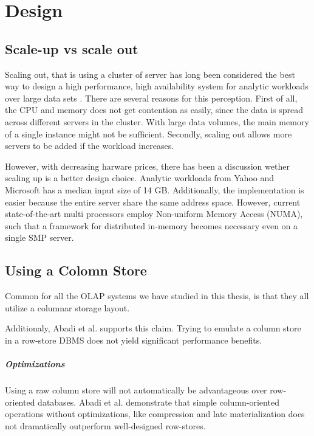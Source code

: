 \chapter{Design}

\section{Scale-up vs scale out}
Scaling out, that is using a cluster of server has long been considered the best way to design a high performance, high availability system for analytic workloads over large data sets \cite{Mukherjee2015-ul}. There are several reasons for this perception. First of all, the CPU and memory does not get contention as easily, since the data is spread across different servers in the cluster. With large data volumes, the main memory of a single instance might not be sufficient. Secondly, scaling out allows more servers to be added if the workload increases.

However, with decreasing harware prices, there has been a discussion wether scaling up is a better design choice. Analytic workloads from Yahoo and Microsoft has a median input size of 14 GB. Additionally, the implementation is easier because the entire server share the same address space. However, current state-of-the-art multi processors employ Non-uniform Memory Access (NUMA), such that a framework for distributed in-memory becomes necessary even on a single SMP server.

\section{Using a Colomn Store}
\label{sec:Using a Colomn Store}
Common for all the OLAP systems we have studied in this thesis, is that they all utilize a columnar storage layout. 

Additionaly, Abadi et al. \cite{Abadi2008-dd} supports this claim. Trying to emulate a column store in a row-store DBMS does not yield significant performance benefits.

\paragraph{Optimizations}
\label{par:Optimizations}
Using a raw column store will not automatically be advantageous over row-oriented databases. Abadi et al. \cite{Abadi2008-dd} demonstrate that simple column-oriented operations without optimizations, like compression and late materialization does not dramatically outperform well-designed row-stores.

